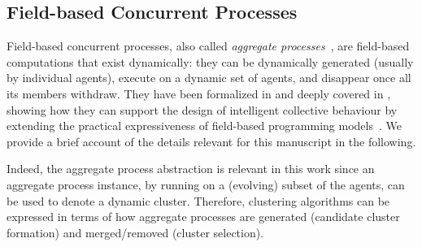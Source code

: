 \subsection{Field-based Concurrent Processes}

Field-based concurrent processes, also called \emph{aggregate processes}~\cite{DBLP:conf/coordination/CasadeiVAPD19,DBLP:journals/eaai/CasadeiVAPD21},
 are field-based computations
 that exist dynamically:
 they can be dynamically generated (usually by individual agents),
 execute on a dynamic set of agents,
 and disappear once all its members withdraw.
%
They have been formalized in \cite{DBLP:conf/coordination/CasadeiVAPD19}
 and deeply covered in \cite{DBLP:journals/eaai/CasadeiVAPD21},
 showing how they can support the design of intelligent collective behaviour by extending the practical expressiveness of field-based programming models~\cite{DBLP:journals/jlap/ViroliBDACP19}.
%
We provide a brief account of the details relevant for this manuscript in the following.

Indeed, the aggregate process abstraction
 is relevant in this work
 since an aggregate process instance,
 by running on a (evolving) subset of the agents,
 can be used to denote a dynamic cluster.
%
Therefore, clustering algorithms
 can be expressed in terms of how
 aggregate processes are generated (candidate cluster formation)
 and
 merged/removed (cluster selection).

